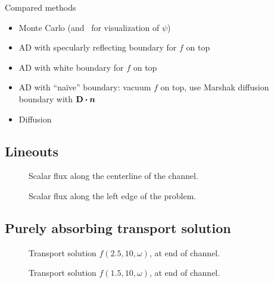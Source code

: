 \documentclass{beamer}
\begin{document}
\begin{frame}{Compared methods}
  \begin{itemize}
    \item Monte Carlo (and \SN\ for visualization of $\psi$)
    \item AD with specularly reflecting boundary for $f$ on top
    \item AD with white boundary for $f$ on top
    \item AD with ``na\"ive'' boundary: vacuum $f$ on top, use Marshak diffusion
      boundary with $\mathbf{D} \bm{\cdot} \bm{n}$
    \item Diffusion
  \end{itemize}
\end{frame}

\subsection{Lineouts}
\begin{frame}
\begin{figure}[tb]
  \centering
  
  \caption{Scalar flux along the centerline of the channel.}
  \label{fig:phiChannel}
\end{figure}
\end{frame}

\begin{frame}
\begin{figure}[tb]
  \centering
  
  \caption{Scalar flux along the left edge of the problem.}
  \label{fig:phiLeft}
\end{figure}
\end{frame}

\subsection{Purely absorbing transport solution}
\begin{frame}
\begin{figure}[tb]
  \centering
  
  \caption{Transport solution $f(2.5,10,\omega)$, at end of channel.}
  \label{fig:fMid}
\end{figure}
\end{frame}

\begin{frame}
\begin{figure}[tb]
  \centering
  
  \caption{Transport solution $f(1.5,10,\omega)$, at end of channel.}
  \label{fig:fLeft}
\end{figure}
\end{frame}
\end{document}
